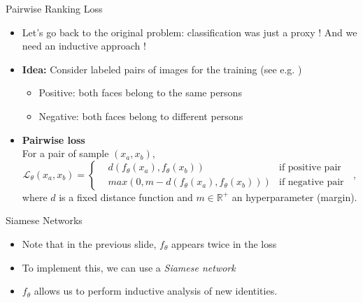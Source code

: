 \documentclass{beamer}
\begin{document}
\begin{frame}{Pairwise Ranking Loss}
\begin{itemize}
    \item Let's go back to the original problem: classification was just a proxy ! And we need an inductive approach !
    \item \textbf{Idea:} Consider labeled pairs of images for the training (see e.g. \cite{schroff2015facenet})
        \begin{itemize}
            \item Positive: both faces belong to the same persons
            \item Negative: both faces belong to different persons
        \end{itemize}
    \item \textbf{Pairwise loss}~\\
    For a pair of sample $(x_a, x_b)$,
    \[ \mathcal{L}_\theta(x_a, x_b) = \left\lbrace 
    \begin{aligned}
        &d(f_\theta(x_a), f_\theta(x_b))&\text{if positive pair}\\
        &max(0, m-d(f_\theta(x_a), f_\theta(x_b)))&\text{if negative pair}
    \end{aligned} \right.
    \;\;, \]
    where $d$ is a fixed distance function and $m\in \mathbb{R}^+$ an hyperparameter (margin). 
\end{itemize}
\end{frame}
    
\begin{frame}{Siamese Networks}
\begin{itemize}
    \item Note that in the previous slide, $f_\theta$ appears twice in the loss
    \item To implement this, we can use a \emph{Siamese network} 
\begin{figure}
    \centering
\end{figure}
\item $f_\theta$ allows us to perform inductive analysis of new identities.
\end{itemize}
\end{frame}
    
\end{document}
